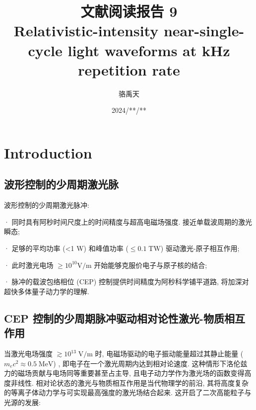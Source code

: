 \documentclass[14pt,a4paper,oneside]{article}
\title{\textbf{文献阅读报告 9\\Relativistic-intensity near-single-cycle light
waveforms at kHz repetition rate}}                           %
\author{骆禹天}                                           %
\date{2024/**/**}                                        %
\numberwithin{equation}{subsection}             %
\numberwithin{figure}{subsection}               %
\begin{document}

\maketitle

\setcounter{page}{1}          %


\tableofcontents              %

\newpage
\setcounter{page}{1}          %








\section{Introduction}

\subsection{波形控制的少周期激光脉}


波形控制的少周期激光脉冲:

· 同时具有阿秒时间尺度上的时间精度与超高电磁场强度. 接近单载波周期的激光瞬态;

· 足够的平均功率 (<1 W) 和峰值功率 ($\leq 0.1 \;\mathrm{TW}$) 驱动激光-原子相互作用;

· 此时激光电场 $\geq 10^{10} \mathrm{V/m}$ 开始能够克服价电子与原子核的结合;

· 脉冲的载波包络相位 (CEP) 控制提供时间精度为阿秒科学铺平道路\cite{UsingPassivelyStable, calegariAdvancesAttosecondScience2016, ciappinaAttosecondPhysicsNanoscale2017}, 将加深对超快多体量子动力学的理解. 

\subsection{CEP 控制的少周期脉冲驱动相对论性激光-物质相互作用}

当激光电场强度 $\gtrsim 10^{13}\; \mathrm{V/m}$ 时, 电磁场驱动的电子振动能量超过其静止能量 ($m_ec^2 \approx 0.5\; \mathrm{MeV}$) , 即电子在一个激光周期内达到相对论速度. 这种情形下洛伦兹力的磁场贡献与电场同等重要甚至占主导, 且电子动力学作为激光场的函数变得高度非线性. 相对论状态的激光与物质相互作用\cite{strozziKineticSimulationLaserplasma2003, mourouOpticsRelativisticRegime2006, dipiazzaExtremelyHighintensityLaser2012}是当代物理学的前沿, 其将高度复杂的等离子体动力学与可实现最高强度的激光场结合起来. 这开启了二次高能粒子与光源的发展:
\end{document}
